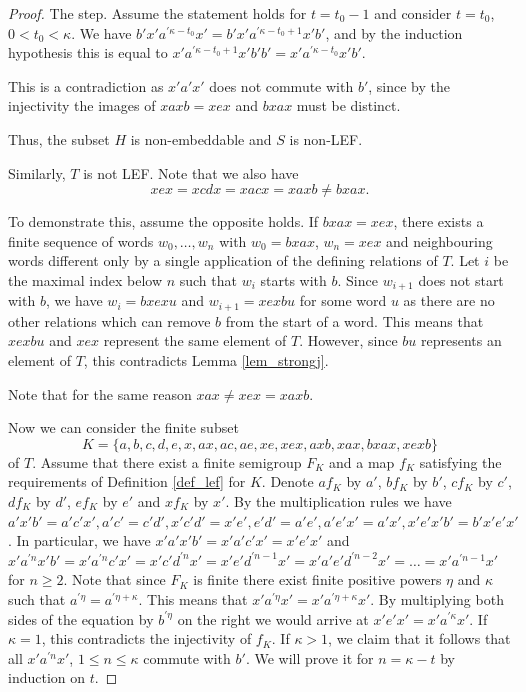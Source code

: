 \documentclass{article}
\theoremstyle{definition}
\begin{document}
\begin{proof}
The step. Assume the statement holds for $t = t_0 -1$ and consider $t = t_0$, $0 < t_0 < \kappa$. We have $b' x' a^{\prime \kappa - t_0 } x' = b' x' a^{\prime \kappa - t_0 +1 } x' b'$, and by the induction hypothesis this is equal to $ x' a^{\prime \kappa - t_0 +1 } x'b' b' = x' a^{\prime \kappa - t_0 } x' b'$.

This is a contradiction as $x'a'x'$ does not commute with $b'$, since by the injectivity the images of $xaxb = xex$ and $bxax$ must be distinct.

Thus, the subset $H$ is non-embeddable and $S$ is non-LEF.


Similarly, $T$ is not LEF. Note that we also have 
$$
xex = xcdx = xacx = xaxb \neq bxax.
$$

To demonstrate this, assume the opposite holds. If $bxax = xex$, there exists a finite sequence of words $w_0, \ldots, w_n$ with $w_0 = bxax$, $w_n = xex$ and neighbouring words different only by a single application of the defining relations of $T$. Let $i$ be the maximal index below $n$ such that $w_i$ starts with $b$. Since  $w_{i+1}$ does not start with $b$, we have $w_{i} = bxex u$ and $w_{i+1} = xex b u$ for some word $u$ as there are no other relations which can remove $b$ from the start of a word. This means that $xex b u$ and $xex$ represent the same element of $T$. However, since $bu$ represents an element of $T$, this contradicts Lemma \ref{lem_strongj}. 

Note that for the same reason $xax \neq xex = xax b$.

Now we can consider the finite subset $$K = \{a,b,c,d,e,x,ax, ac, ae, xe,xex,axb,xax,bxax,xexb\}$$ of $T$. Assume that there exist a finite semigroup $F_K$ and a map $f_K$ satisfying the requirements of Definition \ref{def_lef} for $K$. Denote $af_K$ by $a'$, $b f_K$ by $b'$, $c f_K$ by $c'$, $d f_K$ by $d'$, $e f_K$ by $e'$ and $x f_K$ by $x'$. By the multiplication rules we have $a'x'b' = a'c'x', a'c' = c'd', x'c'd' = x'e', e'd' = a'e', a'e'x' = a'x', x'e'x'b' = b'x'e'x'$. In particular, we have $x' a' x' b' = x'a'c' x' = x'e'x'$ and $x' a^{\prime n} x' b' = x' a^{\prime n} c' x' = x'c' d^{\prime n}  x' = x' e' d^{\prime n-1}  x' = x' a' e' d^{\prime n-2}  x' = \ldots =  x' a^{\prime n-1}  x'$ for $n \ge 2$. Note that since $F_K$ is finite there exist finite positive powers $\eta$ and $\kappa$ such that $a^{\prime \eta} = a^{\prime \eta + \kappa}$. This means that $x' a^{\prime \eta} x' = x' a^{\prime \eta + \kappa} x'$. By multiplying both sides of the equation by $b^{\prime \eta}$ on the right we would arrive at $x' e' x' = x' a^{\prime \kappa} x'$. If $\kappa = 1$, this contradicts the injectivity of $f_K$. If $\kappa > 1$, we claim that it follows that all $x' a^{\prime n} x'$, $1 \le n \le \kappa$ commute with $b'$. We will prove it for $n = \kappa - t$ by induction on $t$.


\end{proof}
\end{document}
